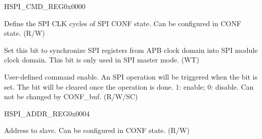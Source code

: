 \begin{register}{H}{SPI\_CMD\_REG}{0x0000}\label{regdesc:SPICMDREG}
%
%
%
%
%
\regnewline%
\begin{regdesc}\begin{reglist}
\label{fielddesc:SPICONFBITLEN}\item [SPI\_CONF\_BITLEN] Define the SPI CLK cycles of SPI CONF state. Can be configured in CONF state. (R/W)
\label{fielddesc:SPIUPDATE}\item [SPI\_UPDATE] Set this bit to synchronize SPI registers from APB clock domain into SPI module clock domain. This bit is only used in SPI master mode. (WT)
\label{fielddesc:SPIUSR}\item [SPI\_USR] User-defined command enable. An SPI operation will be triggered when the bit is set. The bit will be cleared once the operation is done. 1: enable; 0: disable. Can not be changed by CONF\_buf. (R/W/SC)
\end{reglist}\end{regdesc}
\end{register}


\begin{register}{H}{SPI\_ADDR\_REG}{0x0004}\label{regdesc:SPIADDRREG}
%
\regnewline%
\begin{regdesc}\begin{reglist}
\label{fielddesc:SPIUSRADDRVALUE}\item [SPI\_USR\_ADDR\_VALUE] Address to slave. Can be configured in CONF state. (R/W)
\end{reglist}\end{regdesc}
\end{register}


